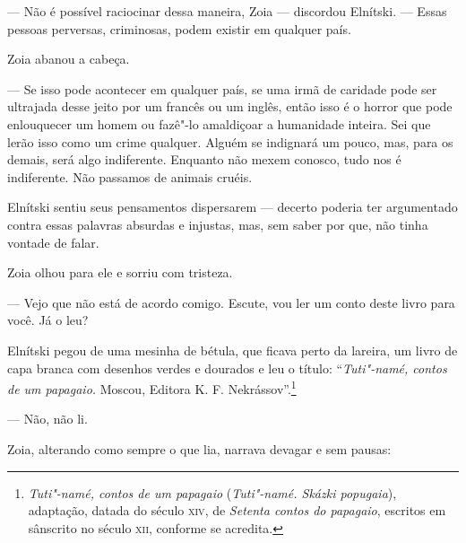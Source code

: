 --- Não é possível raciocinar dessa maneira, Zoia --- discordou
Elnítski. --- Essas pessoas perversas, criminosas, podem existir em
qualquer país.

Zoia abanou a cabeça.

--- Se isso pode acontecer em qualquer país, se uma irmã de caridade
pode ser ultrajada desse jeito por um francês ou um inglês, então isso é
o horror que pode enlouquecer um homem ou fazê"-lo amaldiçoar a
humanidade inteira. Sei que lerão isso como um crime qualquer. Alguém se
indignará um pouco, mas, para os demais, será algo indiferente. Enquanto
não mexem conosco, tudo nos é indiferente. Não passamos de animais
cruéis.

Elnítski sentiu seus pensamentos dispersarem --- decerto poderia ter
argumentado contra essas palavras absurdas e injustas, mas, sem saber
por que, não tinha vontade de falar.

Zoia olhou para ele e sorriu com tristeza.

--- Vejo que não está de acordo comigo. Escute, vou ler um conto deste
livro para você. Já o leu?

Elnítski pegou de uma mesinha de bétula, que ficava perto da lareira, um
livro de capa branca com desenhos verdes e dourados e leu o título:
``\emph{Tuti"-namé, contos de um papagaio.} Moscou, Editora K. F.
Nekrássov''.\footnote{\emph{Tuti"-namé, contos de um
  papagaio} (\emph{Tuti"-namé. Skázki popugaia}), adaptação, datada do
  século \textsc{xiv}, de \emph{Setenta contos do papagaio}, escritos em sânscrito no
  século \textsc{xii}, conforme se acredita.}

--- Não, não li.

Zoia, alterando como sempre o que lia, narrava devagar e sem pausas:

